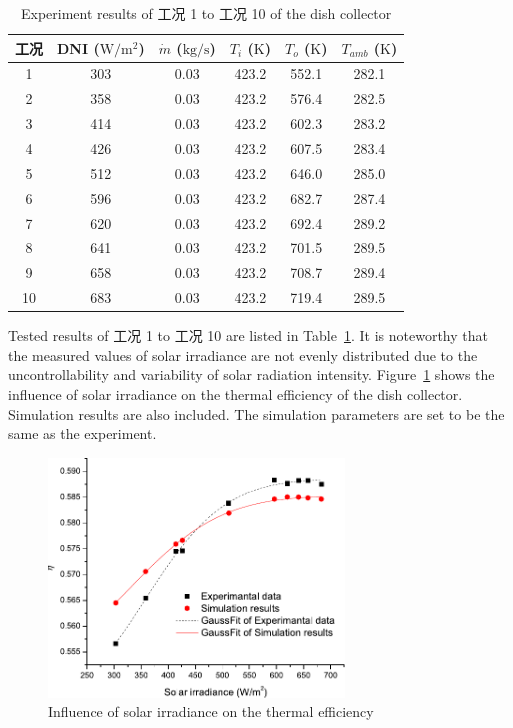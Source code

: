 \begin{table}[htbp]\footnotesize
	\caption{Experiment results of 工况 1 to 工况 10 of the dish collector}
	\begin{center}
	\begin{tabular}{cccccc}
		\toprule
		工况	& DNI ($\mathrm{W/m^2}$)	&	$\dot{m}$ ($\mathrm{kg/s}$)			&	$T_i$ ($\mathrm{K}$)	&	$T_o$ ($\mathrm{K}$)		&	$T_{amb}$ ($\mathrm{K}$)\\
		\midrule
		1	&	303	&	0.03	&	423.2	&	552.1	&	282.1\\
		2	&	358	&	0.03	&	423.2	&	576.4	&	282.5\\
		3	&	414	&	0.03	&	423.2	&	602.3	&	283.2	\\
		4	&	426	&	0.03	&	423.2	&	607.5	&	283.4\\
		5	&	512	&	0.03	&	423.2	&	646.0	&	285.0\\
		6	&	596	&	0.03	&	423.2	&	682.7	&	287.4\\
		7	&	620	&	0.03	&	423.2	&	692.4	&	289.2\\
		8	&	641	&	0.03	&	423.2	&	701.5	&	289.5\\
		9	&	658	&	0.03	&	423.2	&	708.7	&	289.4\\
		10	&	683	&	0.03	&	423.2	&	719.4	&	289.5\\
		\bottomrule
	\end{tabular}
	\end{center}
	\label{tab:ResultOfDish1}
\end{table}
Tested results of 工况 1 to 工况 10 are listed in Table~\ref{tab:ResultOfDish1}. It is noteworthy that the measured values of solar irradiance are not evenly distributed due to the uncontrollability and variability of solar radiation intensity.
Figure~\ref{fig:I_r-eta-dish} shows the influence of solar irradiance on the thermal efficiency of the dish collector. Simulation results are also included. The simulation parameters are set to be the same as the experiment. 
\begin{figure}[!ht]
\centering
\includegraphics[width=0.7\textwidth]{fig/I_r-eta-dish}
\caption{Influence of solar irradiance on the thermal efficiency}
\label{fig:I_r-eta-dish}
\end{figure}

